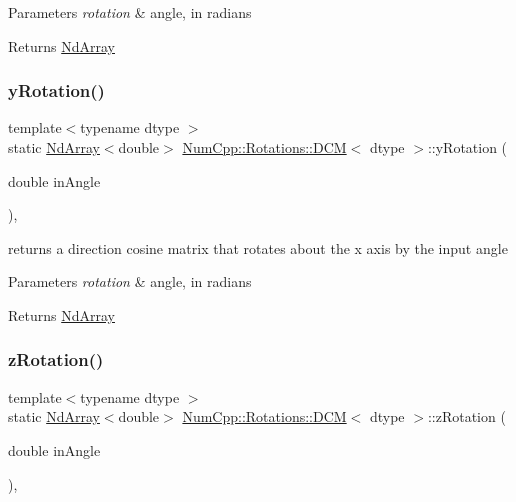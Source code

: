 \begin{DoxyParams}{Parameters}
{\em rotation} & angle, in radians \\
\hline
\end{DoxyParams}
\begin{DoxyReturn}{Returns}
\mbox{\hyperlink{class_num_cpp_1_1_nd_array}{Nd\+Array}} 
\end{DoxyReturn}
\mbox{\label{class_num_cpp_1_1_rotations_1_1_d_c_m_a7843801d5e1f9cb57cbf152205a44bb5}} 
\subsubsection{\texorpdfstring{y\+Rotation()}{yRotation()}}
{\footnotesize\ttfamily template$<$typename dtype $>$ \\
static \mbox{\hyperlink{class_num_cpp_1_1_nd_array}{Nd\+Array}}$<$double$>$ \mbox{\hyperlink{class_num_cpp_1_1_rotations_1_1_d_c_m}{Num\+Cpp\+::\+Rotations\+::\+D\+CM}}$<$ dtype $>$\+::y\+Rotation (\begin{DoxyParamCaption}\item[{double}]{in\+Angle }\end{DoxyParamCaption})\hspace{0.3cm}{\ttfamily [inline]}, {\ttfamily [static]}}

returns a direction cosine matrix that rotates about the x axis by the input angle


\begin{DoxyParams}{Parameters}
{\em rotation} & angle, in radians \\
\hline
\end{DoxyParams}
\begin{DoxyReturn}{Returns}
\mbox{\hyperlink{class_num_cpp_1_1_nd_array}{Nd\+Array}} 
\end{DoxyReturn}
\mbox{\label{class_num_cpp_1_1_rotations_1_1_d_c_m_aaa05c16ece645e72d8396a73bf2a6e32}} 
\subsubsection{\texorpdfstring{z\+Rotation()}{zRotation()}}
{\footnotesize\ttfamily template$<$typename dtype $>$ \\
static \mbox{\hyperlink{class_num_cpp_1_1_nd_array}{Nd\+Array}}$<$double$>$ \mbox{\hyperlink{class_num_cpp_1_1_rotations_1_1_d_c_m}{Num\+Cpp\+::\+Rotations\+::\+D\+CM}}$<$ dtype $>$\+::z\+Rotation (\begin{DoxyParamCaption}\item[{double}]{in\+Angle }\end{DoxyParamCaption})\hspace{0.3cm}{\ttfamily [inline]}, {\ttfamily [static]}}

